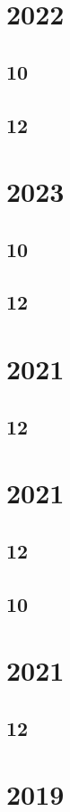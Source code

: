 \documentclass[11pt]{book}
\begin{document}
\section{2022}
\subsection{10}

\subsection{12}

\section{2023}
\subsection{10}

\subsection{12}

\section{2021}
\subsection{12}

\section{2021}
\subsection{12}

\subsection{10}

\section{2021}
\subsection{12}

\section{2019}
\end{document}
